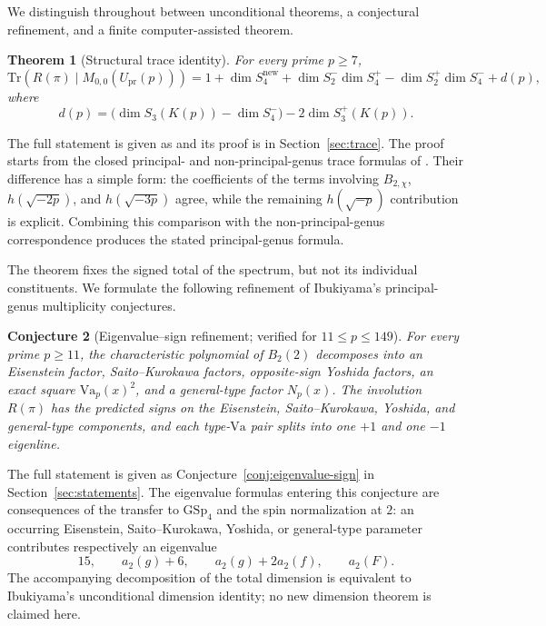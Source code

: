 \documentclass[11pt]{amsart}
\theoremstyle{plain}
\newtheorem{theorem}{Theorem}[section]
\newtheorem{conjecture}[theorem]{Conjecture}
\theoremstyle{definition}
\newcommand{\GSp}{\mathrm{GSp}}
\newcommand{\Tr}{\mathrm{Tr}}
\newcommand{\Upr}{U_{\mathrm{pr}}}
\newcommand{\snew}{S^{\mathrm{new}}}
\providecommand{\Upr}{U_{\mathrm{pr}}}
\providecommand{\snew}{S^{\mathrm{new}}}
\begin{document}
	We distinguish throughout between unconditional theorems, a conjectural
	refinement, and a finite computer-assisted theorem.
	
	\begin{theorem}[Structural trace identity]\label{thm:structural-trace-intro}
		For every prime $p\ge7$,
		\[
		\Tr\!\left(R(\pi)\mid M_{0,0}(\Upr(p))\right)
		=
		1+\dim\snew_4
		+\dim S_2^-\dim S_4^+
		-\dim S_2^+\dim S_4^-
		+d(p),
		\]
		where
		\[
		d(p)=\bigl(\dim S_3(K(p))-\dim S_4^-\bigr)-2\dim S_3^+(K(p)).
		\]
	\end{theorem}
	The full statement is given as   and its proof is in Section~\ref{sec:trace}. The proof starts from the closed principal- and non-principal-genus trace
	formulas of \cite{IbukiyamaKatsura,Ibukiyama2019quinary}. Their difference
	has a simple form: the coefficients of the terms involving
	$B_{2,\chi}$, $h(\sqrt{-2p})$, and $h(\sqrt{-3p})$ agree, while the
	remaining $h(\sqrt{-p})$ contribution is explicit. Combining this
	comparison with the non-principal-genus correspondence produces the stated
	principal-genus formula.
	
	The theorem fixes the signed total of the spectrum, but not its individual
	constituents. We formulate the following refinement of Ibukiyama's
	principal-genus multiplicity conjectures.
	
	\begin{conjecture}[Eigenvalue--sign refinement; verified for $11\le p\le149$]\label{conj:refined-intro}
		For every prime $p\ge11$, the characteristic polynomial of $B_2(2)$
		decomposes into an Eisenstein factor, Saito--Kurokawa factors,
		opposite-sign Yoshida factors, an exact square
		$\mathrm{Va}_p(x)^2$, and a general-type factor $N_p(x)$. The involution
		$R(\pi)$ has the predicted signs on the Eisenstein, Saito--Kurokawa,
		Yoshida, and general-type components, and each type-$\mathrm{Va}$ pair
		splits into one $+1$ and one $-1$ eigenline.
	\end{conjecture}
	The full statement is given as Conjecture~\ref{conj:eigenvalue-sign} in Section~\ref{sec:statements}. The eigenvalue formulas entering this conjecture are consequences of the transfer to $\GSp_4$ and the spin normalization at $2$: an occurring
	Eisenstein, Saito--Kurokawa, Yoshida, or general-type parameter contributes
	respectively an eigenvalue
	\[
	15,\qquad a_2(g)+6,\qquad a_2(g)+2a_2(f),\qquad a_2(F).
	\]
	The accompanying decomposition of the total dimension is equivalent to
	Ibukiyama's unconditional dimension identity; no new dimension theorem is
	claimed here.
	
\end{document}
